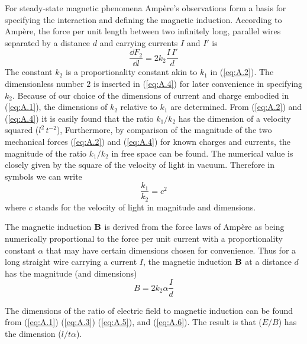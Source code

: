 For steady-state magnetic phenomena Ampère's observations form a basis for specifying the interaction and defining the magnetic induction. According to Ampère, the force per unit length between two infinitely long, parallel wires separated by a distance $d$ and carrying currents $I$ and $I'$ is
\begin{equation}\label{eq:A.4}
\frac{\dd{F_2}}{\dd{l}} = 2 k_2 \frac{I\,I'}{d}
\end{equation}
The constant $k_2$ is a proportionality constant akin to $k_1$ in (\ref{eq:A.2}). The dimensionless number $2$ is inserted in (\ref{eq:A.4}) for later convenience in specifying $k_2$. Because of our choice of the dimensions of current and charge embodied in (\ref{eq:A.1}), the dimensions of $k_2$ relative to $k_1$ are determined. From (\ref{eq:A.2}) and (\ref{eq:A.4}) it is easily found that the ratio $k_1/k_2$ 
has the dimension of a velocity squared ($l^2\,t^{-2}$), Furthermore, by comparison of the magnitude of the two mechanical forces (\ref{eq:A.2}) and (\ref{eq:A.4}) for known charges and currents, the magnitude of the ratio $k_1/k_2$ in free space can be found. The numerical value is closely given by the square of the velocity of light in vacuum. Therefore in symbols we can write
\begin{equation}\label{eq:A.5}
\frac{k_1}{k_2} = c^2
\end{equation}
where $c$ stands for the velocity of light in magnitude and dimensions.

The magnetic induction $\vb{B}$ is derived from the force laws of Ampère as being numerically proportional to the force per unit current with a proportionality constant $\alpha$ that may have certain dimensions chosen for convenience. Thus for a long straight wire carrying a current $I$, the magnetic induction $\vb{B}$ at a distance $d$ has the magnitude (and dimensions)
\begin{equation}\label{eq:A.6}
B = 2 k_2 \alpha \frac{I}{d}
\end{equation}

The dimensions of the ratio of electric field to magnetic induction can be found from (\ref{eq:A.1}) (\ref{eq:A.3}) (\ref{eq:A.5}), and (\ref{eq:A.6}). The result is that ($E/B$) has the dimension ($l/t\alpha$). 

